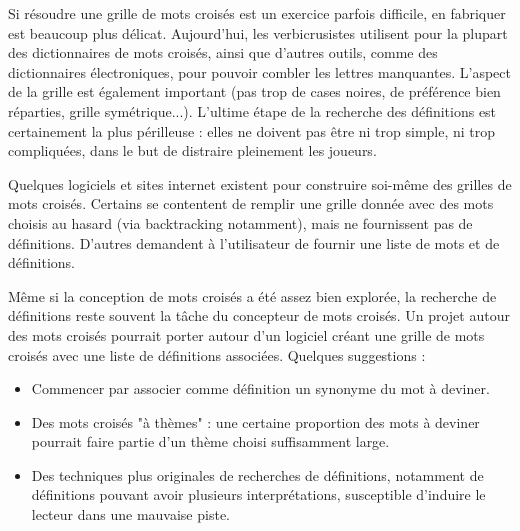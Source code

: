 \documentclass{article}
\begin{document}
Si résoudre une grille de mots croisés est un exercice parfois difficile, en fabriquer est beaucoup plus délicat. Aujourd'hui, les verbicrusistes utilisent pour la plupart des dictionnaires de mots croisés, ainsi que d'autres outils, comme des dictionnaires électroniques, pour pouvoir combler les lettres manquantes. L'aspect de la grille est également important (pas trop de cases noires, de préférence bien réparties, grille symétrique...). L'ultime étape de la recherche des définitions est certainement la plus périlleuse : elles ne doivent pas être ni trop simple, ni trop compliquées, dans le but de distraire pleinement les joueurs.

Quelques logiciels et sites internet existent pour construire soi-même des grilles de mots croisés. Certains se contentent de remplir une grille donnée avec des mots choisis au hasard (via backtracking notamment), mais ne fournissent pas de définitions. D'autres demandent à l'utilisateur de fournir une liste de mots et de définitions.

Même si la conception de mots croisés a été assez bien explorée, la recherche de définitions reste souvent la tâche du concepteur de mots croisés. Un projet autour des mots croisés pourrait porter autour d'un logiciel créant une grille de mots croisés avec une liste de définitions associées. Quelques suggestions :

\begin{itemize}
	\item Commencer par associer comme définition un synonyme du mot à deviner.
	\item Des mots croisés "à thèmes" : une certaine proportion des mots à deviner pourrait faire partie d'un thème choisi suffisamment large.
	\item Des techniques plus originales de recherches de définitions, notamment de définitions pouvant avoir plusieurs interprétations, susceptible d'induire le lecteur dans une mauvaise piste. %
\end{itemize}


\nocite{*}



\end{document}

